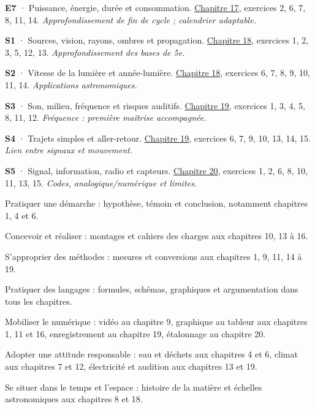 \noindent\textbf{E7} · Puissance, énergie, durée et consommation. \hyperref[chap-17]{Chapitre 17}, exercices 2, 6, 7, 8, 11, 14. \emph{Approfondissement de fin de cycle ; calendrier adaptable.}\par\vspace{2mm}
\noindent\textbf{S1} · Sources, vision, rayons, ombres et propagation. \hyperref[chap-18]{Chapitre 18}, exercices 1, 2, 3, 5, 12, 13. \emph{Approfondissement des bases de 5e.}\par\vspace{2mm}
\noindent\textbf{S2} · Vitesse de la lumière et année-lumière. \hyperref[chap-18]{Chapitre 18}, exercices 6, 7, 8, 9, 10, 11, 14. \emph{Applications astronomiques.}\par\vspace{2mm}
\noindent\textbf{S3} · Son, milieu, fréquence et risques auditifs. \hyperref[chap-19]{Chapitre 19}, exercices 1, 3, 4, 5, 8, 11, 12. \emph{Fréquence : première maîtrise accompagnée.}\par\vspace{2mm}
\noindent\textbf{S4} · Trajets simples et aller-retour. \hyperref[chap-19]{Chapitre 19}, exercices 6, 7, 9, 10, 13, 14, 15. \emph{Lien entre signaux et mouvement.}\par\vspace{2mm}
\noindent\textbf{S5} · Signal, information, radio et capteurs. \hyperref[chap-20]{Chapitre 20}, exercices 1, 2, 6, 8, 10, 11, 13, 15. \emph{Codes, analogique/numérique et limites.}\par\vspace{2mm}
\begin{questions}
\item Pratiquer une démarche : hypothèse, témoin et conclusion, notamment chapitres 1, 4 et 6.
\item Concevoir et réaliser : montages et cahiers des charges aux chapitres 10, 13 à 16.
\item S’approprier des méthodes : mesures et conversions aux chapitres 1, 9, 11, 14 à 19.
\item Pratiquer des langages : formules, schémas, graphiques et argumentation dans tous les chapitres.
\item Mobiliser le numérique : vidéo au chapitre 9, graphique au tableur aux chapitres 1, 11 et 16, enregistrement au chapitre 19, étalonnage au chapitre 20.
\item Adopter une attitude responsable : eau et déchets aux chapitres 4 et 6, climat aux chapitres 7 et 12, électricité et audition aux chapitres 13 et 19.
\item Se situer dans le temps et l’espace : histoire de la matière et échelles astronomiques aux chapitres 8 et 18.
\end{questions}
